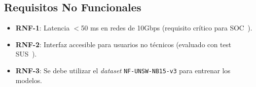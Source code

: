 \subsection{Requisitos No Funcionales}   \label{sec.req-no-funcionales}
\begin{itemize}  
    \item \textbf{RNF-1}: Latencia $<$50 ms en redes de 10Gbps (requisito crítico para SOC~\cite{nist2021ai}).  
    \item \textbf{RNF-2}: Interfaz accesible para usuarios no técnicos (evaluado con test SUS~\cite{brooke1996sus}).
    \item \textbf{RNF-3}: Se debe utilizar el \textit{dataset} \texttt{NF-UNSW-NB15-v3} para entrenar los modelos.  
\end{itemize}  
